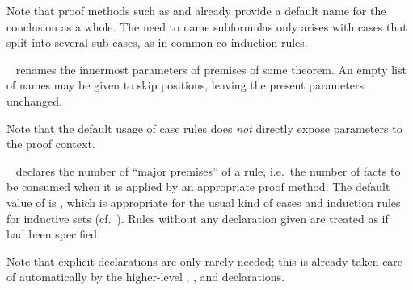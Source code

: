 \begin{isabellebody}
\begin{isamarkuptext}
\begin{description}
  Note that proof methods such as \hyperlink{method.induct}{\mbox{}} and \hyperlink{method.coinduct}{\mbox{}} already provide a default name for the conclusion as a
  whole.  The need to name subformulas only arises with cases that
  split into several sub-cases, as in common co-induction rules.

  \item \hyperlink{attribute.params}{\mbox{}}~ renames
  the innermost parameters of premises  of some
  theorem.  An empty list of names may be given to skip positions,
  leaving the present parameters unchanged.
  
  Note that the default usage of case rules does \emph{not} directly
  expose parameters to the proof context.
  
  \item \hyperlink{attribute.consumes}{\mbox{}}~ declares the number of ``major
  premises'' of a rule, i.e.\ the number of facts to be consumed when
  it is applied by an appropriate proof method.  The default value of
  \hyperlink{attribute.consumes}{\mbox{}} is , which is appropriate for
  the usual kind of cases and induction rules for inductive sets (cf.\
  ).  Rules without any \hyperlink{attribute.consumes}{\mbox{}} declaration given are treated as if \hyperlink{attribute.consumes}{\mbox{}}~ had been specified.
  
  Note that explicit \hyperlink{attribute.consumes}{\mbox{}} declarations are only
  rarely needed; this is already taken care of automatically by the
  higher-level \hyperlink{attribute.cases}{\mbox{\isa{cases}}}, \hyperlink{attribute.induct}{\mbox{}}, and
  \hyperlink{attribute.coinduct}{\mbox{\isa{coinduct}}} declarations.


\end{description}
\end{isamarkuptext}
\end{isabellebody}

